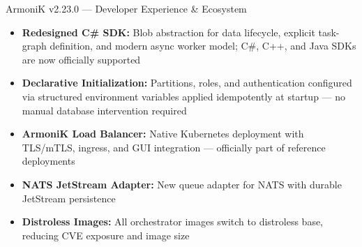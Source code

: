 \begin{frame}{ArmoniK v2.23.0 — Developer Experience \& Ecosystem}
	\begin{itemize}
		\item \textbf{Redesigned C\# SDK:} Blob abstraction for data lifecycle, explicit task-graph definition, and modern async worker model; C\#, C++, and Java SDKs are now officially supported
		\item \textbf{Declarative Initialization:} Partitions, roles, and authentication configured via structured environment variables applied idempotently at startup — no manual database intervention required
		\item \textbf{ArmoniK Load Balancer:} Native Kubernetes deployment with TLS/mTLS, ingress, and GUI integration — officially part of reference deployments
		\item \textbf{NATS JetStream Adapter:} New queue adapter for NATS with durable JetStream persistence
		\item \textbf{Distroless Images:} All orchestrator images switch to distroless base, reducing CVE exposure and image size
	\end{itemize}
\end{frame}
